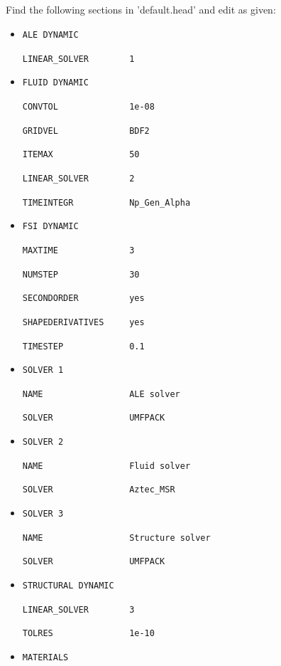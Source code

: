 \subsection{\head}
Find the following sections in 'default.head' and edit as given:
\begin{itemize}

 \item \verb|ALE DYNAMIC|

 \verb|LINEAR_SOLVER        1|

 \item \verb|FLUID DYNAMIC|

 \verb|CONVTOL              1e-08|
 
 \verb|GRIDVEL              BDF2|
 
 \verb|ITEMAX               50|
 
 \verb|LINEAR_SOLVER        2|
 
 \verb|TIMEINTEGR           Np_Gen_Alpha|
 
 \item \verb|FSI DYNAMIC|

 \verb|MAXTIME              3|
 
 \verb|NUMSTEP              30|
 
 \verb|SECONDORDER          yes|

 \verb|SHAPEDERIVATIVES     yes|
 
 \verb|TIMESTEP             0.1|

 \item \verb|SOLVER 1|
 
 \verb|NAME                 ALE solver|

 \verb|SOLVER               UMFPACK|

 \item \verb|SOLVER 2|
 
 \verb|NAME                 Fluid solver|

 \verb|SOLVER               Aztec_MSR|

 \item \verb|SOLVER 3|
 
 \verb|NAME                 Structure solver|

 \verb|SOLVER               UMFPACK|

 \item \verb|STRUCTURAL DYNAMIC|

 \verb|LINEAR_SOLVER        3|
 
 \verb|TOLRES               1e-10|

 \item \verb|MATERIALS|
 

\end{itemize}
